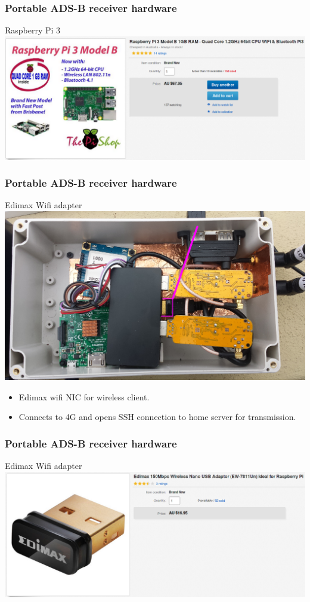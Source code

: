 \begin{frame}
\frametitle{Portable ADS-B receiver hardware}
\begin{block}{Raspberry Pi 3}
\includegraphics[height=0.4\textheight]{image/ebay-rpi3.png}
\end{block}
\end{frame}

\begin{frame}
\frametitle{Portable ADS-B receiver hardware}
\begin{block}{Edimax Wifi adapter}
\includegraphics[height=0.5\textheight]{image/adsb-hardware-edimax.png}
\begin{itemize}
\item Edimax wifi NIC for wireless client.
\item Connects to 4G and opens SSH connection to home server for transmission.
\end{itemize}
\end{block}
\end{frame}

\begin{frame}
\frametitle{Portable ADS-B receiver hardware}
\begin{block}{Edimax Wifi adapter}
\includegraphics[height=0.4\textheight]{image/ebay-edimax.png}
\end{block}
\end{frame}

